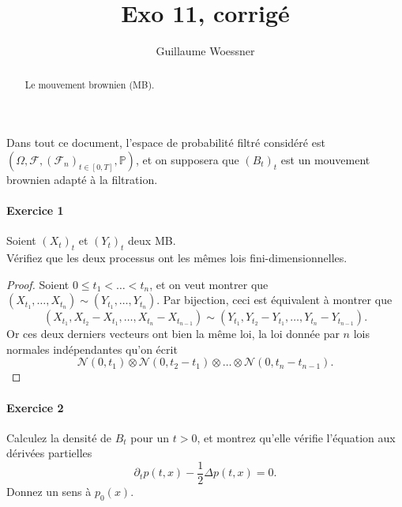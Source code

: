 \documentclass{article}
\title{Exo 11, corrigé}
\author{Guillaume Woessner}
\date{}                       %
\theoremstyle{definition}
\numberwithin{equation}{section}
\begin{document}
\maketitle                    %

\begin{abstract}
\begin{center}
Le mouvement brownien (MB).
\end{center}
\end{abstract}



Dans tout ce document, l'espace de probabilité filtré considéré est $(\Omega,\mathcal{F},(\mathcal{F}_n)_{t\in[0,T]},\mathbb{P})$, et on supposera que $(B_t)_t$ est un mouvement brownien adapté à la filtration.


\paragraph{Exercice 1}
Soient $(X_t)_t$ et $(Y_t)_t$ deux MB.\\
Vérifiez que les deux processus ont les mêmes lois fini-dimensionnelles.

\begin{proof}
Soient $0\leq t_1 < \dots < t_n$, et on veut montrer que $(X_{t_1},\dots,X_{t_n})\sim (Y_{t_1},\dots,Y_{t_n})$. Par bijection, ceci est équivalent à montrer que 
$$ (X_{t_1},X_{t_2}-X_{t_1},\dots,X_{t_n}-X_{t_{n-1}}) \sim (Y_{t_1},Y_{t_2}-Y_{t_1},\dots,Y_{t_n}-Y_{t_{n-1}}). $$
Or ces deux derniers vecteurs ont bien la même loi, la loi donnée par $n$ lois normales indépendantes qu'on écrit
$$ \mathcal{N}(0,t_1)\otimes\mathcal{N}(0,t_2-t_1)\otimes\dots\otimes\mathcal{N}(0,t_n-t_{n-1}). $$
\end{proof}





\paragraph{Exercice 2}
Calculez la densité de $B_t$ pour un $t>0$, et montrez qu'elle vérifie l'équation aux dérivées partielles
$$ \partial_t p(t,x) - \dfrac{1}{2}\Delta p(t,x) =0. $$ 
Donnez un sens à $p_0(x)$.
\end{document}
